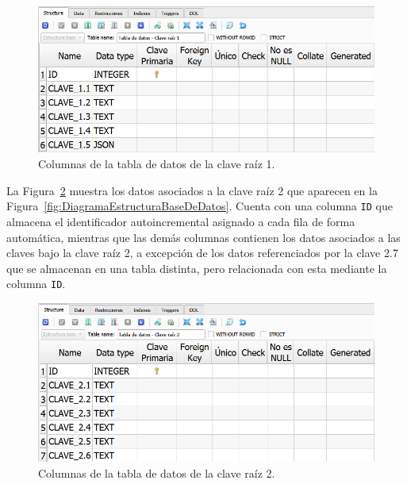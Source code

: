 \begin{figure}[H]
\centering
\includegraphics[width=.9\textwidth]{fig/Base de datos estructura/Columnas tabla de datos clave raiz 1.png}
\caption{Columnas de la tabla de datos de la clave raíz 1.}
\label{fig:ColumnasTablaDatosClaveRaiz1}
\end{figure}

La Figura~\ref{fig:ColumnasTablaDatosClaveRaiz2} muestra los datos asociados a la clave raíz 2 que aparecen en la Figura~\ref{fig:DiagramaEstructuraBaseDeDatos}. Cuenta con una columna \texttt{ID} que almacena el identificador autoincremental asignado a cada fila de forma automática, mientras que las demás columnas contienen los datos asociados a las claves bajo la clave raíz 2, a excepción de los datos referenciados por la clave 2.7 que se almacenan en una tabla distinta, pero relacionada con esta mediante la columna \texttt{ID}.

\begin{figure}[H]
\centering
\includegraphics[width=.9\textwidth]{fig/Base de datos estructura/Columnas tabla de datos clave raiz 2.png}
\caption{Columnas de la tabla de datos de la clave raíz 2.}
\label{fig:ColumnasTablaDatosClaveRaiz2}
\end{figure}

